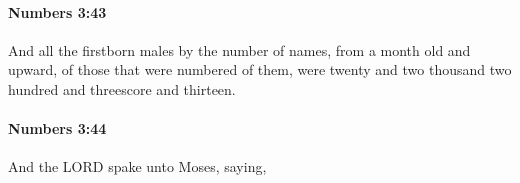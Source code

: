 		\paragraph{Numbers 3:43} %
			\label{NUMBERS-3-43}

			And all the firstborn males by the number of names, from a month old and upward, of those that were numbered of them, were twenty and two thousand two hundred and threescore and thirteen.


		\paragraph{Numbers 3:44} %
			\label{NUMBERS-3-44}

			And the LORD spake unto Moses, saying,


